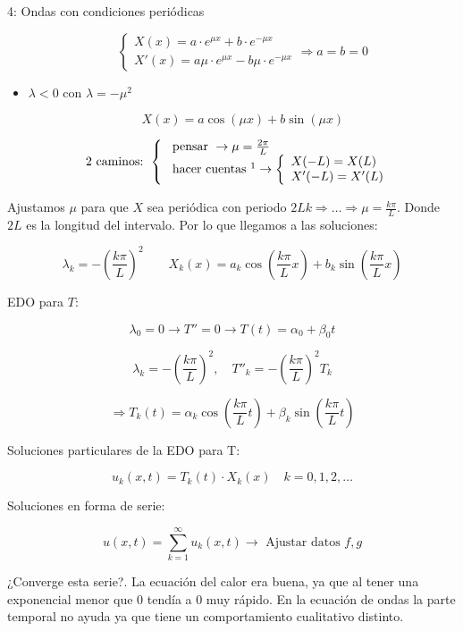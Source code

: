 \begin{example}{4: Ondas con condiciones periódicas}
\begin{itemize}
					\[\begin{cases}
						X(x) = a\cdot e^{\mu x} + b \cdot e^{-\mu x} \\
						X'(x) = a\mu \cdot e^{\mu x} - b \mu \cdot e^{-\mu x}
					\end{cases}
					\Rightarrow a = b = 0 \]


				\item $\lambda < 0$ con $\lambda = -\mu^2$

					\[ X (x) = a \cos (\mu x) + b \sin (\mu x) \]

					\[\text{2 caminos: }\left\{\begin{array}{l}
						\text{ pensar }\rightarrow \mu = \frac{2\pi}{L} \\
						\text{ hacer cuentas }\footnotemark\rightarrow \left\{ \begin{array}{l}
							X(-L) = X(L) \\
							X'(-L) = X'(L)
						\end{array} \right.
					\end{array}
					\right. \]
			\end{itemize}

			Ajustamos $\mu$ para que $X$ sea periódica con periodo $2L k \Rightarrow … \Rightarrow \mu = \frac{k \pi}{L}$. Donde $2L$ es la longitud del intervalo. Por lo que llegamos a las soluciones:

			\[
			\lambda_k = -\left(\frac{k\pi}{L}\right)^2\quad\quad X_k(x) = a_k \cos \left( \frac{k\pi}{L} x \right) + b_k \sin \left( \frac{k\pi}{L} x \right)
			\]

			EDO para $T$:

			\[ \lambda_0 = 0 \rightarrow T''=0 \rightarrow T(t) = \alpha_0 + \beta_0 t\]

			\[ \lambda_k = - \left( \frac{k\pi}{L} \right)^2, \quad T''_k = - \left( \frac{k\pi}{L} \right)^2 T_k \]

			\[\Rightarrow T_k(t) = \alpha_k \cos \left( \frac{k\pi}{L} t \right) + \beta_k \sin \left( \frac{k\pi}{L} t \right) \]

			Soluciones particulares de la EDO para T:

			\[u_k (x,t) = T_k(t) \cdot X_k(x) \quad k = 0,1,2,… \]


			Soluciones en forma de serie:

			\[u(x,t) = \sum_{k=1}^{\infty} u_k (x,t) \rightarrow \text{ Ajustar datos } f,g \]

			¿Converge esta serie?. La ecuación del calor era buena, ya que al tener una exponencial menor que 0 tendía a 0 muy rápido. En la ecuación de ondas la parte temporal no ayuda ya que tiene un comportamiento cualitativo distinto.


\end{example}
